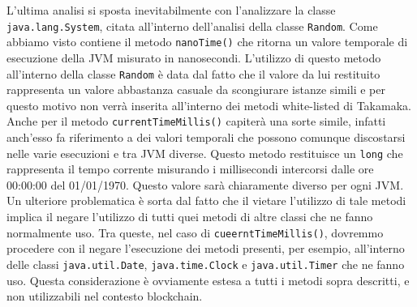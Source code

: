 L'ultima analisi si sposta inevitabilmente con l'analizzare la classe \lstinline|java.lang.System|, citata all'interno dell'analisi della classe \lstinline|Random|. Come abbiamo visto contiene il metodo \lstinline|nanoTime()| che ritorna un valore temporale di esecuzione della JVM misurato in nanosecondi. L'utilizzo di questo metodo all'interno della classe \lstinline|Random| è data dal fatto che il valore da lui restituito rappresenta un valore abbastanza casuale da scongiurare istanze simili e per questo motivo non verrà inserita all'interno dei metodi white-listed di Takamaka. Anche per il metodo \lstinline|currentTimeMillis()| capiterà una sorte simile, infatti anch'esso fa riferimento a dei valori temporali che possono comunque discostarsi nelle varie esecuzioni e tra JVM diverse. Questo metodo restituisce un \lstinline|long| che rappresenta il tempo corrente misurando i millisecondi intercorsi dalle ore 00:00:00 del 01/01/1970. Questo valore sarà chiaramente diverso per ogni JVM. Un ulteriore problematica è sorta dal fatto che il vietare l'utilizzo di tale metodi implica il negare l'utilizzo di tutti quei metodi di altre classi che ne fanno normalmente uso. Tra queste, nel caso di \lstinline|cueerntTimeMillis()|, dovremmo procedere con il negare l'esecuzione dei metodi presenti, per esempio, all'interno delle classi \lstinline|java.util.Date|, \lstinline|java.time.Clock| e \lstinline|java.util.Timer| che ne fanno uso. Questa considerazione è ovviamente estesa a tutti i metodi sopra descritti, e non utilizzabili nel contesto blockchain.